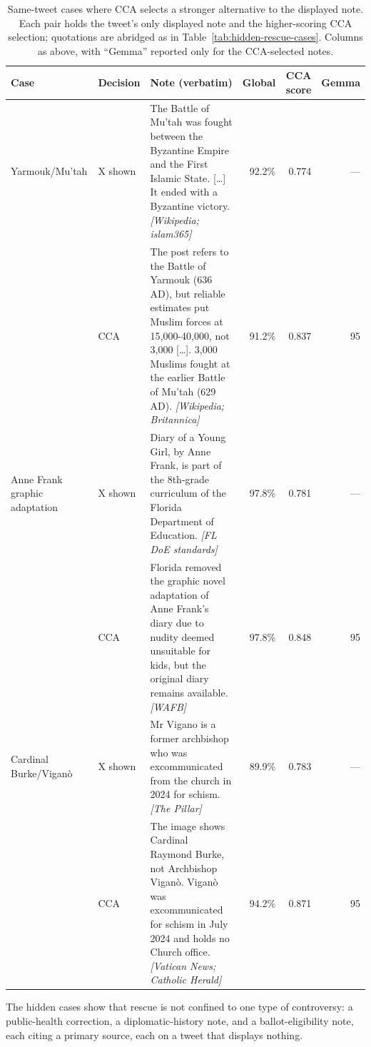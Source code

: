 \documentclass[10pt,twocolumn]{article}
\begin{document}
\begin{table}[t]
\centering
\fontsize{7.5}{8.8}\selectfont
\setlength{\tabcolsep}{3pt}
\renewcommand{\arraystretch}{1.04}
\begin{tabularx}{\textwidth}{@{}p{2.1cm}p{1.25cm}>{\raggedright\arraybackslash}Xrrr@{}}
\toprule
\textbf{Case} & \textbf{Decision} & \textbf{Note (verbatim)} &
\textbf{Global} & \textbf{CCA score} & \textbf{Gemma} \\
\midrule
Yarmouk/Mu'tah & X shown &
The Battle of Mu'tah was fought between the Byzantine Empire and the First
Islamic State. [\ldots] It ended with a Byzantine victory.
\emph{[Wikipedia; islam365]}
& 92.2\% & 0.774 & --- \\
& CCA &
The post refers to the Battle of Yarmouk (636 AD), but reliable estimates put
Muslim forces at 15,000-40,000, not 3,000 [\ldots]. 3,000 Muslims fought at the
earlier Battle of Mu'tah (629 AD). \emph{[Wikipedia; Britannica]}
& 91.2\% & 0.837 & 95 \\
\addlinespace
Anne Frank graphic adaptation & X shown &
Diary of a Young Girl, by Anne Frank, is part of the 8th-grade curriculum of
the Florida Department of Education. \emph{[FL DoE standards]}
& 97.8\% & 0.781 & --- \\
& CCA &
Florida removed the graphic novel adaptation of Anne Frank's diary due to
nudity deemed unsuitable for kids, but the original diary remains available.
\emph{[WAFB]}
& 97.8\% & 0.848 & 95 \\
\addlinespace
Cardinal Burke/Vigan\`o & X shown &
Mr Vigano is a former archbishop who was excommunicated from the church in
2024 for schism. \emph{[The Pillar]}
& 89.9\% & 0.783 & --- \\
& CCA &
The image shows Cardinal Raymond Burke, not Archbishop Vigan\`o. Vigan\`o was
excommunicated for schism in July 2024 and holds no Church office.
\emph{[Vatican News; Catholic Herald]}
& 94.2\% & 0.871 & 95 \\
\bottomrule
\end{tabularx}
\caption{Same-tweet cases where CCA selects a stronger alternative to the
displayed note. Each pair holds the tweet's only displayed note and the
higher-scoring CCA selection; quotations are abridged as in
Table~\ref{tab:hidden-rescue-cases}. Columns as above, with ``Gemma'' reported
only for the CCA-selected notes.}
\label{tab:better-alternatives}
\end{table}

The hidden cases show that rescue is not confined to one type of controversy: a
public-health correction, a diplomatic-history note, and a ballot-eligibility
note, each citing a primary source, each on a tweet that displays nothing.
\end{document}
